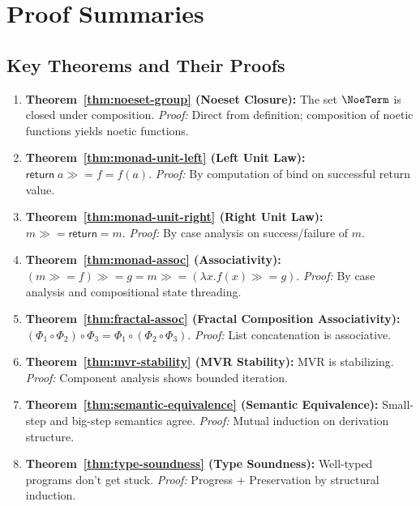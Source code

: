 \documentclass[11pt,twoside,openright]{book}
\theoremstyle{definition}
\theoremstyle{plain}
\theoremstyle{remark}
\newcommand{\rpmret}{\mathsf{return}}
\newcommand{\rpmbind}{\mathbin{\gg\!=}}
\newcommand{\Frac}{\Phi}
\begin{document}
\chapter{Proof Summaries}
\label{app:proofs}

\section{Key Theorems and Their Proofs}

\begin{enumerate}
\item \textbf{Theorem~\ref{thm:noeset-group} (Noeset Closure):} The set $\NoeTerm$ is closed under composition. \textit{Proof:} Direct from definition; composition of noetic functions yields noetic functions.

\item \textbf{Theorem~\ref{thm:monad-unit-left} (Left Unit Law):} $\rpmret\; a \rpmbind f = f(a)$. \textit{Proof:} By computation of bind on successful return value.

\item \textbf{Theorem~\ref{thm:monad-unit-right} (Right Unit Law):} $m \rpmbind \rpmret = m$. \textit{Proof:} By case analysis on success/failure of $m$.

\item \textbf{Theorem~\ref{thm:monad-assoc} (Associativity):} $(m \rpmbind f) \rpmbind g = m \rpmbind (\lambda x. f(x) \rpmbind g)$. \textit{Proof:} By case analysis and compositional state threading.

\item \textbf{Theorem~\ref{thm:fractal-assoc} (Fractal Composition Associativity):} $(\Frac_1 \circ \Frac_2) \circ \Frac_3 = \Frac_1 \circ (\Frac_2 \circ \Frac_3)$. \textit{Proof:} List concatenation is associative.

\item \textbf{Theorem~\ref{thm:mvr-stability} (MVR Stability):} MVR is stabilizing. \textit{Proof:} Component analysis shows bounded iteration.

\item \textbf{Theorem~\ref{thm:semantic-equivalence} (Semantic Equivalence):} Small-step and big-step semantics agree. \textit{Proof:} Mutual induction on derivation structure.

\item \textbf{Theorem~\ref{thm:type-soundness} (Type Soundness):} Well-typed programs don't get stuck. \textit{Proof:} Progress + Preservation by structural induction.
\end{enumerate}
\end{document}

